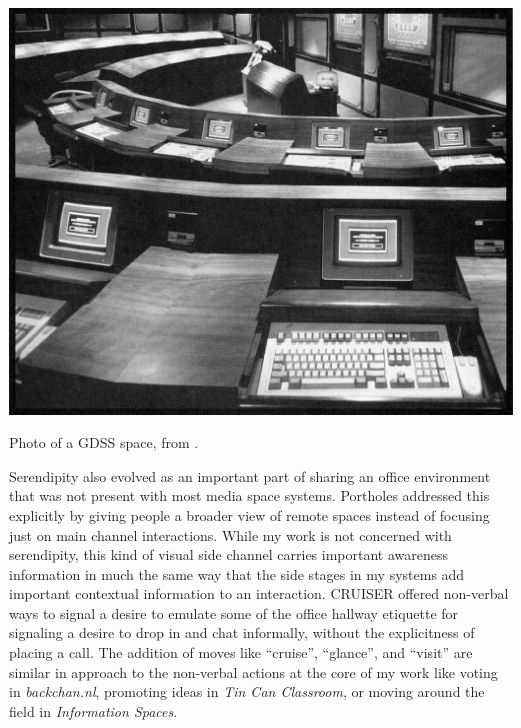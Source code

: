 

\begin{marginfigure}
	\includegraphics{figures/nunamaker_gdss.png}
	\caption{Photo of a GDSS space, from \citep{nunamaker_electronic_1991}.}
	\label{fig:gdss}
\end{marginfigure}




Serendipity also evolved as an important part of sharing an office environment that was not present with most media space systems. Portholes \citep{Dourish:1992fu} addressed this explicitly by giving people a broader view of remote spaces instead of focusing just on main channel interactions. While my work is not concerned with serendipity, this kind of visual side channel carries important awareness information in much the same way that the side stages in my systems add important contextual information to an interaction. CRUISER \citep{Fish:1992vz} offered non-verbal ways to signal a desire to emulate some of the office hallway etiquette for signaling a desire to drop in and chat informally, without the explicitness of placing a call. The addition of moves like ``cruise'', ``glance'', and ``visit'' are similar in approach to the non-verbal actions at the core of my work like voting in \emph{backchan.nl}, promoting ideas in \emph{Tin Can Classroom}, or moving around the field in \emph{Information Spaces}. 

